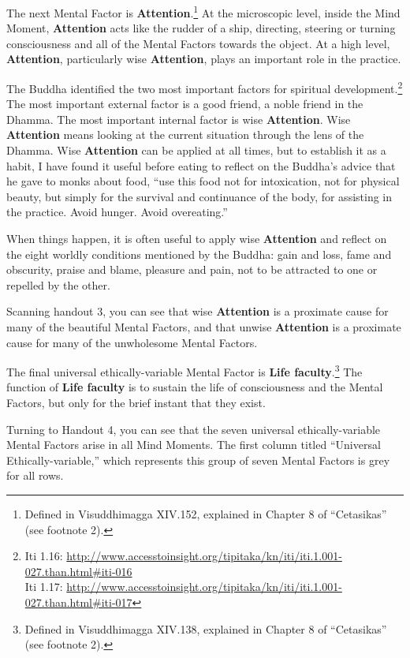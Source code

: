 The next Mental Factor is \textbf{Attention}.\footnote{Defined in Visuddhimagga XIV.152, explained in Chapter 8 of “Cetasikas” (see footnote 2).} At the microscopic level, inside the Mind Moment, \textbf{Attention} acts like the rudder of a ship, directing, steering or turning consciousness and all of the Mental Factors towards the object. At a high level, \textbf{Attention}, particularly wise \textbf{Attention}, plays an important role in the \color{blue} practice\color{black}.

The Buddha identified the two most important factors for spiritual development.\footnote{Iti 1.16: \url{http://www.accesstoinsight.org/tipitaka/kn/iti/iti.1.001-027.than.html\#iti-016}\\Iti 1.17: \url{http://www.accesstoinsight.org/tipitaka/kn/iti/iti.1.001-027.than.html\#iti-017}} The most important external factor is a good friend, a noble friend in the Dhamma. The most important internal factor is wise \textbf{Attention}. Wise \textbf{Attention} means looking at the current situation through the lens of the Dhamma. Wise \textbf{Attention} can be applied at all times, but to establish it as a habit, I have found it useful before eating to reflect on the Buddha’s advice that he gave to monks about food, “use this food not for intoxication, not for physical beauty, but simply for the survival and continuance of the body, for assisting in the \color{blue} practice\color{black}. Avoid hunger. Avoid overeating.”

When things happen, it is often useful to apply wise \textbf{Attention} and reflect on the eight worldly conditions mentioned by the Buddha: gain and loss, fame and obscurity, praise and blame, pleasure and pain, not to be attracted to one or repelled by the other.

Scanning handout 3, you can see that wise \textbf{Attention} is a proximate cause for many of the beautiful Mental Factors, and that unwise \textbf{Attention} is a proximate cause for many of the unwholesome Mental Factors.

The final universal ethically-variable Mental Factor is \textbf{Life faculty}.\footnote{Defined in Visuddhimagga XIV.138, explained in Chapter 8 of “Cetasikas” (see footnote 2).} The function of \textbf{Life faculty} is to sustain the life of consciousness and the Mental Factors, but only for the brief instant that they exist.

Turning to Handout 4, you can see that the seven universal ethically-variable Mental Factors arise in all Mind Moments. The first column titled “Universal Ethically-variable,” which represents this group of seven Mental Factors is grey for all rows.

